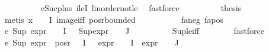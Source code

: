 \begin{isabellebody}
\ \ \ \ \ \ \ \ \isamarkupfalse%
\ eSuc{\isacharunderscore}{\kern0pt}plus{\isacharunderscore}{\kern0pt}{}\ ileI{}\ linorder{\isacharunderscore}{\kern0pt}not{\isacharunderscore}{\kern0pt}le\ \isamarkupfalse%
\ fastforce\isanewline
\ \ \ \ \ \ \isamarkupfalse%
\ \isamarkupfalse%
\ {\isacharquery}{\kern0pt}thesis\ \isanewline
\ \ \ \ \ \ \ \ \isamarkupfalse%
\ {\isacharparenleft}{\kern0pt}metis\ {\isacartoucheopen}x\ {\isasymin}\ {\isasymPhi}\ {\isacharbackquote}{\kern0pt}\ I{\isacartoucheclose}\ image{\isacharunderscore}{\kern0pt}iff\ pos{\isacharunderscore}{\kern0pt}r{\isacharunderscore}{\kern0pt}bounded{\isacharparenright}{\kern0pt}\isanewline
\ \ \ \ \isamarkupfalse%
\isanewline
\ \ \ \ \isamarkupfalse%
\ fa{\isacharunderscore}{\kern0pt}neg\ fa{\isacharunderscore}{\kern0pt}pos\ \isamarkupfalse%
\ e{}{\isacharcolon}{\kern0pt}\ {\isachardoublequoteopen}Sup\ {\isacharparenleft}{\kern0pt}{\isacharparenleft}{\kern0pt}expr{\isacharunderscore}{\kern0pt}{}\ {\isasymcirc}\ {\isasymPhi}{\isacharparenright}{\kern0pt}\ {\isacharbackquote}{\kern0pt}\ I{\isacharparenright}{\kern0pt}\ {\isasymle}\ {}{\isachardoublequoteclose}\ {\isachardoublequoteopen}Sup{\isacharparenleft}{\kern0pt}{\isacharparenleft}{\kern0pt}expr{\isacharunderscore}{\kern0pt}{}\ {\isasymcirc}\ {\isasymPhi}{\isacharparenright}{\kern0pt}\ {\isacharbackquote}{\kern0pt}\ J{\isacharparenright}{\kern0pt}\ {\isasymle}\ {}{\isachardoublequoteclose}\isanewline
\ \ \ \ \ \ \isamarkupfalse%
\ Sup{\isacharunderscore}{\kern0pt}le{\isacharunderscore}{\kern0pt}iff\isanewline
\ \ \ \ \ \ \isamarkupfalse%
\ fastforce{\isacharplus}{\kern0pt}\isanewline
\ \ \ \ \isamarkupfalse%
\ e{}{\isacharcolon}{\kern0pt}\ {\isachardoublequoteopen}Sup\ {\isacharparenleft}{\kern0pt}{\isacharparenleft}{\kern0pt}expr{\isacharunderscore}{\kern0pt}{}\ {\isacharbackquote}{\kern0pt}\ {\isacharparenleft}{\kern0pt}pos{\isacharunderscore}{\kern0pt}r\ {\isacharparenleft}{\kern0pt}{\isasymPhi}\ {\isacharbackquote}{\kern0pt}\ I{\isacharparenright}{\kern0pt}{\isacharparenright}{\kern0pt}{\isacharparenright}{\kern0pt}\ \ {\isasymunion}\ {\isacharparenleft}{\kern0pt}expr{\isacharunderscore}{\kern0pt}{}\ {\isasymcirc}\ {\isasymPhi}{\isacharparenright}{\kern0pt}\ {\isacharbackquote}{\kern0pt}\ I\ {\isasymunion}\ {\isacharparenleft}{\kern0pt}expr{\isacharunderscore}{\kern0pt}{}\ {\isasymcirc}\ {\isasymPhi}{\isacharparenright}{\kern0pt}\ {\isacharbackquote}{\kern0pt}\ J{\isacharparenright}{\kern0pt}\ {\isasymle}\ {}{\isachardoublequoteclose}\isanewline

\end{isabellebody}
